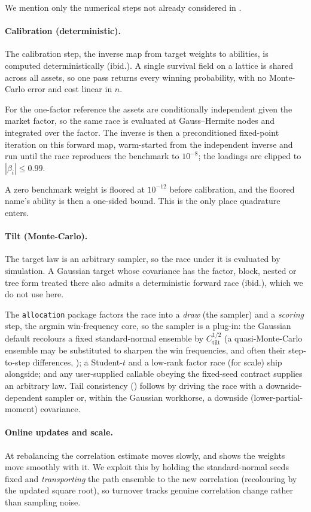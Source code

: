 We mention only the numerical steps not already considered in
\textcite{cotton2026inversion}.

\paragraph{Calibration (deterministic).}
The calibration step, the inverse map from target weights to abilities, is
computed deterministically (ibid.). A single survival field on a
lattice is shared across all assets, so one pass returns every winning
probability, with no Monte-Carlo error and cost linear in $n$.

For the one-factor reference the assets are conditionally independent given the
market factor, so the same race is evaluated at Gauss--Hermite nodes and
integrated over the factor.
The inverse is then a preconditioned fixed-point
iteration on this forward map, warm-started from the independent inverse and run
until the race reproduces the benchmark to $10^{-8}$; the loadings are clipped to
$|\beta_i| \le 0.99$.

A zero benchmark weight is floored at $10^{-12}$ before
calibration, and the floored name's ability is then a one-sided bound.
This is
the only place quadrature enters.

\paragraph{Tilt (Monte-Carlo).}
The target law is an arbitrary sampler, so the race under it is evaluated by
simulation. A Gaussian target whose covariance has the factor, block, nested or
tree form treated there also admits a deterministic forward race (ibid.), which we
do not use here.

The \texttt{allocation} package factors the race into a
\emph{draw} (the sampler) and a \emph{scoring} step, the argmin win-frequency
core, so the sampler is a plug-in: the Gaussian default recolours a fixed
standard-normal ensemble by $C_{\mathrm{tilt}}^{1/2}$ (a quasi-Monte-Carlo ensemble may be substituted to sharpen the win frequencies, and often their step-to-step differences, ); a Student-$t$ and a low-rank
factor race (for scale) ship alongside; and any user-supplied callable obeying the
fixed-seed contract supplies an arbitrary law. Tail consistency () follows by
driving the race with a downside-dependent sampler or, within the Gaussian
workhorse, a downside (lower-partial-moment) covariance.

\paragraph{Online updates and scale.}
At rebalancing the correlation estimate moves slowly, and 
shows the weights move smoothly with it. We exploit this by holding the
standard-normal seeds fixed and \emph{transporting} the path ensemble to the new
correlation (recolouring by the updated square root), so turnover tracks genuine
correlation change rather than sampling noise.

